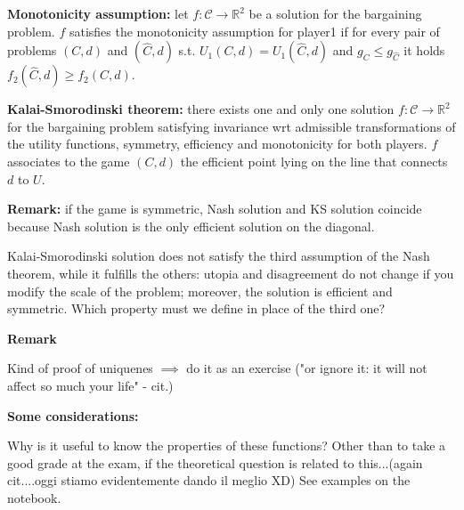 \bigskip
\noindent \textbf{Monotonicity assumption:} let $f: \mathcal{C} \rightarrow \mathbb{R}^2$ be a solution for the bargaining problem. $f$ satisfies the monotonicity assumption for player1 if for every pair of problems $(C,d)$ and $(\hat{C},d)$ s.t. $U_1(C,d) = U_1(\hat{C},d)$ and $g_C \leq g_{\hat{C}}$ it holds $f_2(\hat{C},d) \geq f_2(C,d)$.

\bigskip
\noindent \textbf{Kalai-Smorodinski theorem:} there exists one and only one solution $f: \mathcal{C} \rightarrow \mathbb{R}^2$ for the bargaining problem satisfying invariance wrt admissible transformations of the utility functions, symmetry, efficiency and monotonicity for both players. $f$ associates to the game $(C,d)$ the efficient point lying on the line that connects $d$ to $U$.

\bigskip
\noindent \textbf{Remark:} if the game is symmetric, Nash solution and KS 
solution coincide because Nash solution is the only efficient solution on the 
diagonal.

\noindent Kalai-Smorodinski solution does not satisfy the third assumption of 
the Nash theorem, while it fulfills the others: utopia and disagreement do not 
change if you modify the scale of the problem; moreover, the solution is 
efficient and symmetric. Which property must we define in place of the third 
one?

\bigskip
\noindent \textbf{Remark}

\noindent Kind of proof of uniquenes $\implies$ do it as an exercise {(\huge "or 
ignore it: it will not affect so much your life" - cit.)}

\bigskip
\noindent \textbf{Some considerations:}

\noindent Why is it useful to know the properties of these functions? 
{\huge Other than to take a good grade at the exam, if the theoretical question 
is related to this...(again cit....oggi stiamo evidentemente dando il meglio 
XD)} 
See examples on the notebook.

%

%
